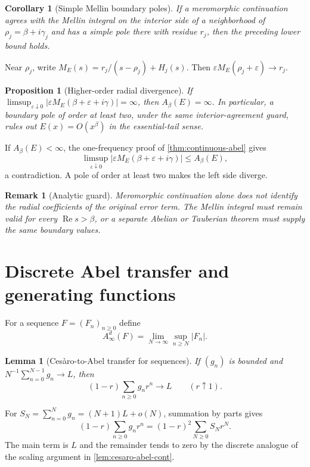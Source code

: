 \documentclass[12pt,a4paper,twoside]{extarticle}
\makeatletter
\theoremstyle{compactplain}
\newtheorem{proposition}[theorem]{Proposition}
\newtheorem{lemma}[theorem]{Lemma}
\newtheorem{corollary}[theorem]{Corollary}
\theoremstyle{compactdef}
\newtheorem{remark}[theorem]{Remark}
\renewenvironment{proof}[1][\proofname]{\par\pushQED{\qed}\normalfont
  \topsep2pt\trivlist\item[\hskip\labelsep\bfseries #1\@addpunct{.}]\ignorespaces}
 {\popQED\endtrivlist\@endpefalse}
\makeatother
\begin{document}
\begin{corollary}[Simple Mellin boundary poles]
If a meromorphic continuation agrees with the Mellin integral on the interior side of a neighborhood of $\rho_j=\beta+i\gamma_j$ and has a simple pole there with residue $r_j$, then the preceding lower bound holds.
\end{corollary}
\begin{proof}
Near $\rho_j$, write $M_E(s)=r_j/(s-\rho_j)+H_j(s)$.  Then $\varepsilon M_E(\rho_j+\varepsilon)\to r_j$.
\end{proof}

\begin{proposition}[Higher-order radial divergence]
If $\limsup_{\varepsilon\downarrow0}|\varepsilon M_E(\beta+\varepsilon+i\gamma)|=\infty$, then $A_\beta(E)=\infty$.  In particular, a boundary pole of order at least two, under the same interior-agreement guard, rules out $E(x)=O(x^\beta)$ in the essential-tail sense.
\end{proposition}
\begin{proof}
If $A_\beta(E)<\infty$, the one-frequency proof of \cref{thm:continuous-abel} gives
\[
 \limsup_{\varepsilon\downarrow0}|\varepsilon M_E(\beta+\varepsilon+i\gamma)|\le A_\beta(E),
\]
a contradiction.  A pole of order at least two makes the left side diverge.
\end{proof}

\begin{remark}[Analytic guard]
Meromorphic continuation alone does not identify the radial coefficients of the original error term.  The Mellin integral must remain valid for every $\operatorname{Re}s>\beta$, or a separate Abelian or Tauberian theorem must supply the same boundary values.
\end{remark}

\section{Discrete Abel transfer and generating functions}\label{sec:discrete-transfer}
For a sequence $F=(F_n)_{n\ge0}$ define
\[
 A_\infty^d(F)=\lim_{N\to\infty}\sup_{n\ge N}|F_n|.
\]

\begin{lemma}[Ces\`aro-to-Abel transfer for sequences]\label{lem:cesaro-abel-disc}
If $(g_n)$ is bounded and $N^{-1}\sum_{n=0}^{N-1}g_n\to L$, then
\[
 (1-r)\sum_{n\ge0}g_nr^n\to L\qquad(r\uparrow1).
\]
\end{lemma}
\begin{proof}
For $S_N=\sum_{n=0}^Ng_n=(N+1)L+o(N)$, summation by parts gives
\[
 (1-r)\sum_{n\ge0}g_nr^n=(1-r)^2\sum_{N\ge0}S_Nr^N.
\]
The main term is $L$ and the remainder tends to zero by the discrete analogue of the scaling argument in \cref{lem:cesaro-abel-cont}.
\end{proof}
\end{document}
